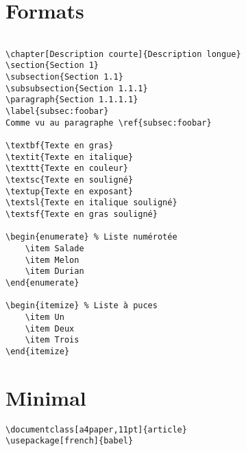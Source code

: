 \documentclass{article}
\begin{document}
\begin{multicols*}{3}
\section*{Formats}
\begin{lstlisting}

\chapter[Description courte]{Description longue}
\section{Section 1}
\subsection{Section 1.1}
\subsubsection{Section 1.1.1}
\paragraph{Section 1.1.1.1}
\label{subsec:foobar}
Comme vu au paragraphe \ref{subsec:foobar}

\textbf{Texte en gras}
\textit{Texte en italique}
\texttt{Texte en couleur}
\textsc{Texte en souligné}
\textup{Texte en exposant}
\textsl{Texte en italique souligné}
\textsf{Texte en gras souligné}

\begin{enumerate} % Liste numérotée
    \item Salade
    \item Melon
    \item Durian
\end{enumerate}

\begin{itemize} % Liste à puces
    \item Un
    \item Deux
    \item Trois
\end{itemize}
\end{lstlisting}
\section*{Minimal}

\begin{lstlisting}
\documentclass[a4paper,11pt]{article}
\usepackage[french]{babel}


\end{lstlisting}
\end{multicols*}
\end{document}
